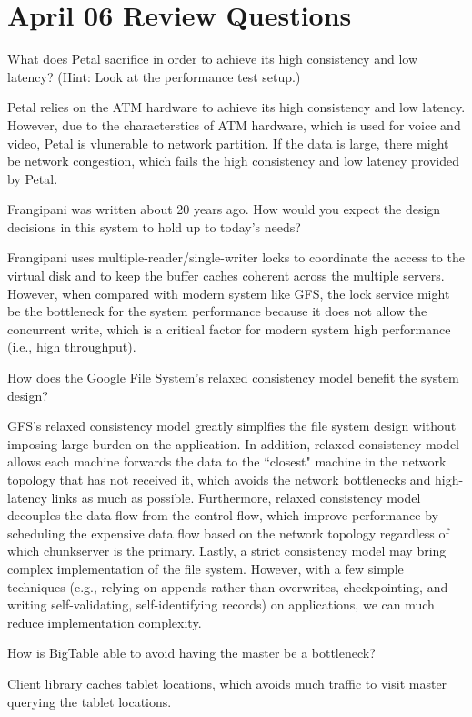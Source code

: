 \section{April 06 Review Questions}
\begin{QandA}
   \item  What does Petal sacrifice in order to achieve its high consistency and low latency? (Hint: Look at the performance test setup.)
         \begin{answered}
		 Petal relies on the ATM hardware to achieve its high consistency and low latency. However, due to the characterstics of ATM hardware,
		 which is used for voice and video, Petal is vlunerable to network partition. If the data is large, there might be network congestion,
		 which fails the high consistency and low latency provided by Petal.
         \end{answered}

   \item  Frangipani was written about 20 years ago. How would you expect the design decisions in this system to hold up to today's needs?
         \begin{answered}
		 Frangipani uses multiple-reader/single-writer locks to coordinate the access to the virtual disk and to keep the buffer caches
		 coherent across the multiple servers. However, when compared with modern system like GFS, the lock service might be the bottleneck
		 for the system performance because it does not allow the concurrent write, which is a critical factor for modern system
		 high performance (i.e., high throughput).		 
         \end{answered}
   \item How does the Google File System's relaxed consistency model benefit the system design?
         \begin{answered}
         GFS's relaxed consistency model greatly simplfies the file system design without imposing large burden on the application.
         In addition, relaxed consistency model allows each machine forwards the data to the ``closest" machine in the network topology
         that has not received it, which avoids the network bottlenecks and high-latency links as much as possible. Furthermore, relaxed
         consistency model decouples the data flow from the control flow, which improve performance by scheduling the expensive data 
         flow based on the network topology regardless of which chunkserver is the primary. Lastly, a strict consistency model
         may bring complex implementation of the file system. However, with a few simple techniques (e.g., relying on appends rather than overwrites, checkpointing, and writing self-validating, self-identifying records) on applications, we can much reduce implementation complexity.
         \end{answered}
   \item How is BigTable able to avoid having the master be a bottleneck?
         \begin{answered}
         Client library caches tablet locations, which avoids much traffic to visit master querying the tablet locations.
         \end{answered}
\end{QandA}




